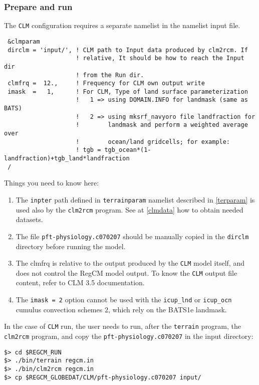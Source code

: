 \subsubsection{Prepare and run}
\label{clmrun}

The \verb=CLM= configuration requires a separate namelist in the namelist input
file.

{\footnotesize
\begin{Verbatim}
 &clmparam
 dirclm = 'input/', ! CLM path to Input data produced by clm2rcm. If 
                    ! relative, It should be how to reach the Input dir
                    ! from the Run dir.
 clmfrq =  12.,     ! Frequency for CLM own output write
 imask  =   1,      ! For CLM, Type of land surface parameterization
                    !   1 => using DOMAIN.INFO for landmask (same as BATS)
                    !   2 => using mksrf_navyoro file landfraction for
                    !        landmask and perform a weighted average over
                    !        ocean/land gridcells; for example:
                    ! tgb = tgb_ocean*(1-landfraction)+tgb_land*landfraction
 /
\end{Verbatim}
}

Things you need to know here:

\begin{enumerate}
\item The \verb=inpter= path defined in \verb=terrainparam= namelist
described in \ref{terparam} is used also by the \verb=clm2rcm= program.
See at \ref{clmdata} how to obtain needed datasets.
\item The file \verb=pft-physiology.c070207= should be manually copied in the
\verb=dirclm= directory before running the model.
\item The clmfrq is relative to the output produced by the \verb=CLM= model
itself, and does not control the RegCM model output. To know the \verb=CLM=
output file content, refer to CLM 3.5 documentation.
\item The \verb'imask = 2' option cannot be used with the \verb'icup_lnd' or
\verb'icup_ocn' cumulus convection schemes $2$, which rely on the BATS1e
landmask.
\end{enumerate}

In the case of \verb=CLM= run, the user needs to run, after the \verb=terrain=
program, the \verb=clm2rcm= program, and copy the \verb=pft-physiology.c070207=
in the input directory:

\begin{Verbatim}
$> cd $REGCM_RUN
$> ./bin/terrain regcm.in
$> ./bin/clm2rcm regcm.in
$> cp $REGCM_GLOBEDAT/CLM/pft-physiology.c070207 input/
\end{Verbatim}

